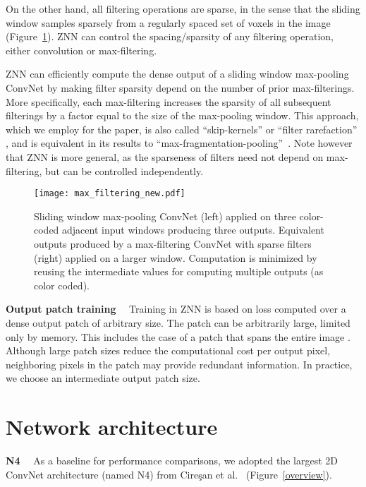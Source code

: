 \documentclass{article} %
\begin{document}
On the other hand, all filtering operations are sparse, in the sense
that the sliding window samples sparsely from a regularly spaced set
of voxels in the image (Figure~\ref{max-filter}).  ZNN can control the spacing/sparsity of any
filtering operation, either convolution or max-filtering.

ZNN can efficiently compute the dense output of a sliding window
max-pooling ConvNet by making filter sparsity depend on the number of
prior max-filterings.  More specifically, each max-filtering increases
the sparsity of all subsequent filterings by a factor equal to the
size of the max-pooling window.  This approach, which we employ for
the paper, is also called ``skip-kernels'' \cite{Sermanet2014} or
``filter rarefaction'' \cite{Long2015}, and is equivalent in its
results to
``max-fragmentation-pooling''~\cite{Giusti2013,Masci2013}. Note
however that ZNN is more general, as the sparseness of filters need
not depend on max-filtering, but can be controlled independently.

\begin{figure}[t]
\begin{center}
\texttt{[image: max\_filtering\_new.pdf]}
\end{center}
\caption{Sliding window max-pooling ConvNet (left) applied on three color-coded adjacent input windows producing three outputs. Equivalent outputs produced by a max-filtering ConvNet with sparse filters (right) applied on a larger window. Computation is minimized by reusing the intermediate values for computing multiple outputs (as color coded).}
\label{max-filter}
\end{figure}

{\bf Output patch training}$\quad$
Training in ZNN is based on loss computed over a dense output patch of
arbitrary size. The patch can be arbitrarily large, limited only by memory.
This includes the case of a patch that spans the
entire image \cite{Long2015, Masci2013}.  Although large patch sizes
reduce the computational cost per output pixel, neighboring pixels in
the patch may provide redundant information.  In practice, we choose
an intermediate output patch size.



\section{Network architecture}

{\bf N4}$\quad$
As a baseline for performance comparisons, we adopted the largest 2D ConvNet architecture (named N4) from Cire\c{s}an et al.~\cite{Ciresan2012} (Figure~\ref{overview}).
\end{document}
